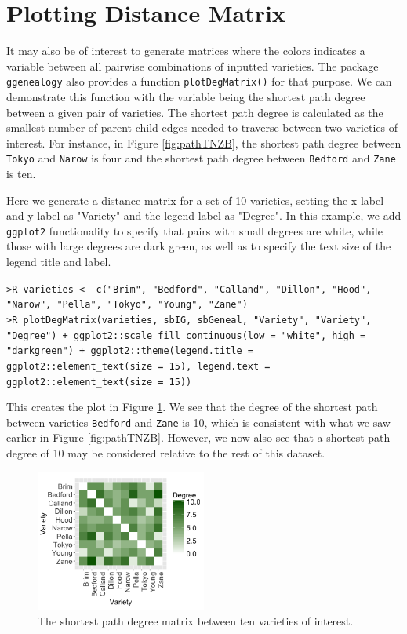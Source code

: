 \documentclass[11pt,a4paper,oldfontcommands,openany]{memoir}
\DeclareRobustCommand{\mybox}[2][gray!15]{%
\begin{tcolorbox}[   %
        breakable,
        left=0pt,
        right=0pt,
        top=0pt,
        bottom=0pt,
        colback=#1,
        colframe=#1,
        width=\dimexpr\textwidth\relax, 
        enlarge left by=0mm,
        boxsep=5pt,
        arc=0pt,outer arc=0pt,
        ]
        #2
\end{tcolorbox}
}
\numberwithin{equation}{section} %
\newcommand{\code}[1]{{\texttt{#1}}}
\newcommand{\pkg}[1]{{\texttt{#1}}}
\begin{document}
\section{Plotting Distance Matrix}

It may also be of interest to generate matrices where the colors indicates a variable between all pairwise combinations of inputted varieties. The package \pkg{ggenealogy} also provides a function \code{plotDegMatrix()} for that purpose. We can demonstrate this function with the variable being the shortest path degree between a given pair of varieties. The shortest path degree is calculated as the smallest number of parent-child edges needed to traverse between two varieties of interest. For instance, in Figure \ref{fig:pathTNZB}, the shortest path degree between \code{Tokyo} and \code{Narow} is four and the shortest path degree between \code{Bedford} and \code{Zane} is ten.

Here we generate a distance matrix for a set of 10 varieties, setting the x-label and y-label as "Variety" and the legend label as "Degree". In this example, we add \pkg{ggplot2} functionality to specify that pairs with small degrees are white, while those with large degrees are dark green, as well as to specify the text size of the legend title and label.

\mybox{
\texttt{>R varieties <- c("Brim", "Bedford", "Calland", "Dillon", "Hood", "Narow", "Pella", "Tokyo", "Young", "Zane")}\\
\texttt{>R plotDegMatrix(varieties, sbIG, sbGeneal, "Variety", "Variety", "Degree") + ggplot2::scale\_fill\_continuous(low = "white", high = "darkgreen") + ggplot2::theme(legend.title = ggplot2::element\_text(size = 15), legend.text = ggplot2::element\_text(size = 15))}
}

This creates the plot in Figure \ref{fig:degMatrix}. We see that the degree of the shortest path between varieties \code{Bedford} and \code{Zane} is 10, which is consistent with what we saw earlier in Figure \ref{fig:pathTNZB}. However, we now also see that a shortest path degree of 10 may be considered relative to the rest of this dataset.

\begin{figure}[h]
    \centering
    \includegraphics[width=0.5\textwidth]{degMatrix}
    \caption{The shortest path degree matrix between ten varieties of interest.}
    \label{fig:degMatrix}
\end{figure}
\end{document}
